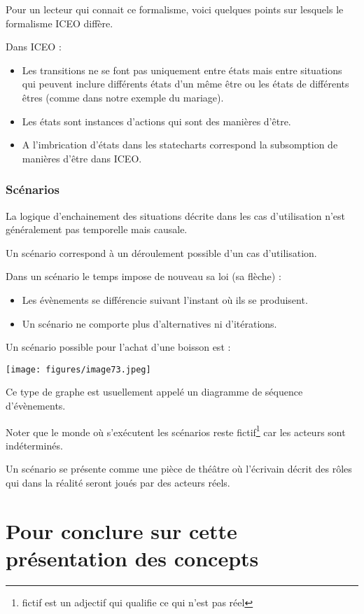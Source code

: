 \documentclass[a4paper, 12pt, openright, french]{book}
\begin{document}
Pour un lecteur qui connait ce formalisme, voici quelques points sur
lesquels le formalisme ICEO diffère.

Dans ICEO :

\begin{itemize}
\item
  Les transitions ne se font pas uniquement entre états mais entre
  situations qui peuvent inclure différents états d'un
  même être ou les états de différents êtres (comme dans notre exemple
  du mariage).
\item
  Les états sont instances d'actions qui sont des
  manières d'être.
\item
  A l'imbrication d'états dans les
  statecharts correspond la subsomption de manières
  d'être dans ICEO.
\end{itemize}


\subsection{Scénarios}

La logique d'enchainement des situations décrite dans
les cas d'utilisation n'est généralement
pas temporelle mais causale.

Un scénario correspond à un déroulement possible d'un
cas d'utilisation.

Dans un scénario le temps impose de nouveau sa loi (sa flèche) :

\begin{itemize}
\item
  Les évènements se différencie suivant l'instant où ils
  se produisent.
\item
  Un scénario ne comporte plus d'alternatives ni
  d'itérations.
\end{itemize}

Un scénario possible pour l'achat d'une
boisson est :

\texttt{[image: figures/image73.jpeg]}

Ce type de graphe est usuellement appelé un diagramme de séquence
d'évènements.

Noter que le monde où s'exécutent les scénarios reste
fictif\footnote{fictif est un adjectif qui qualifie ce qui
	n'est pas réel} car les acteurs sont indéterminés.

Un scénario se présente comme une pièce de théâtre où
l'écrivain décrit des rôles qui dans la réalité seront
joués par des acteurs réels.


\chapter{Pour conclure sur cette présentation des concepts}
\end{document}
